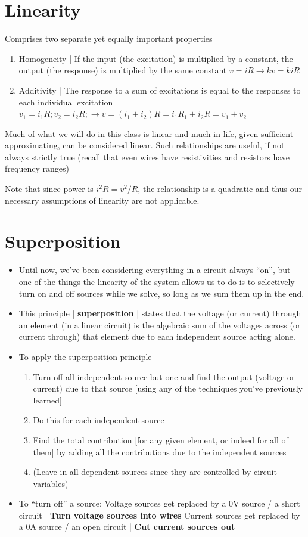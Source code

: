 \documentclass[11pt]{book}
\begin{document}
\section{Linearity}
Comprises two separate yet equally important properties

\begin{enumerate}
	\item Homogeneity | If the input (the excitation) is multiplied by a constant, the output (the response) is multiplied by the same constant
	\subitem $v = iR \rightarrow kv = kiR$
	\item Additivity | The response to a sum of excitations is equal to the responses to each individual excitation
	\subitem  $v_1 = i_1R; v_2 = i_2R; \rightarrow v = (i_1 + i_2)R = i_1R_1 +i_2R = v_1 + v_2$
\end{enumerate}

Much of what we will do in this class is linear and much in life, given sufficient approximating, can be considered linear. Such relationships are useful, if not always strictly true (recall that even wires have resistivities and resistors have frequency ranges)

Note that since power is $i^2R = v^2/R$, the relationship is a quadratic and thus our necessary assumptions of linearity are not applicable.


\section{Superposition}
\begin{itemize}
	\item Until now, we’ve been considering everything in a circuit always ``on'', but one of the things the linearity of the system allows us to do is to selectively turn on and off sources while we solve, so long as we sum them up in the end.
	\item This principle | \textbf{superposition} | states that the voltage (or current) through an element (in a linear circuit) is the algebraic sum of the voltages across (or current through) that element due to each independent source acting alone. 
	\item To apply the superposition principle
	\begin{enumerate}
		\item Turn off all independent source but one and find the output (voltage or current) due to that source [using any of the techniques you’ve previously learned]
		\item Do this for each independent source
		\item Find the total contribution [for any given element, or indeed for all of them] by adding all the contributions due to the independent sources
		\item (Leave in all dependent sources since they are controlled by circuit variables)
	\end{enumerate}
	\item To “turn off” a source:
	\subitem Voltage sources get replaced by a 0V source / a short circuit | \textbf{Turn voltage sources into wires}
	\subitem Current sources get replaced by a 0A source / an open circuit | \textbf{Cut current sources out}
\end{itemize}
\end{document}
